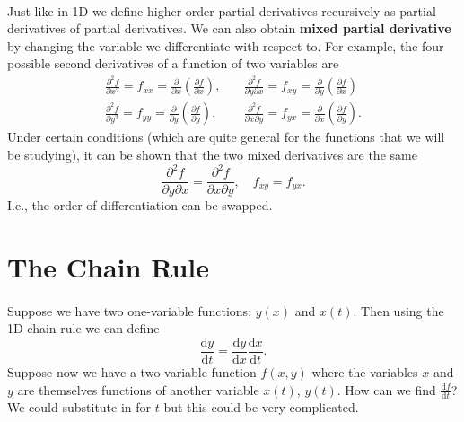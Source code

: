 \documentclass[../multivariate_calculus.tex]{subfiles}
\begin{document}
        \paragraph{}
        Just like in 1D we define higher order partial derivatives recursively as partial derivatives of partial derivatives.
        We can also obtain \textbf{mixed partial derivative} by changing the variable we differentiate with respect to.
        For example, the four possible second derivatives of a function of two variables are
        \begin{align}
            \frac{\partial^2 f}{\partial x^2}=f_{xx}=\frac{\partial}{\partial x}\left(\frac{\partial f}{\partial x}\right),&\quad\frac{\partial^2 f}{\partial y\partial x}=f_{xy}=\frac{\partial}{\partial y}\left(\frac{\partial f}{\partial x}\right)\\
            \frac{\partial^2 f}{\partial y^2}=f_{yy}=\frac{\partial}{\partial y}\left(\frac{\partial f}{\partial y}\right),&\quad\frac{\partial^2 f}{\partial x\partial y}=f_{yx}=\frac{\partial}{\partial x}\left(\frac{\partial f}{\partial y}\right).
        \end{align}
        Under certain conditions (which are quite general for the functions that we will be studying), it can be shown that the two mixed derivatives are the same
        \begin{equation}
            \frac{\partial^2 f}{\partial y\partial x}=\frac{\partial^2 f}{\partial x\partial y},\quad f_{xy}=f_{yx}.
        \end{equation}
        I.e., the order of differentiation can be swapped.

    \section{The Chain Rule}
        \paragraph{}
        Suppose we have two one-variable functions; $y(x)$ and $x(t)$.
        Then using the 1D chain rule we can define
        \begin{equation}
            \frac{\mathrm{d}y}{\mathrm{d}t}=\frac{\mathrm{d}y}{\mathrm{d}x}\frac{\mathrm{d}x}{\mathrm{d}t}.
        \end{equation}
        Suppose now we have a two-variable function $f(x,y)$ where the variables $x$ and $y$ are themselves functions of another variable $x(t)$, $y(t)$.
        How can we find $\frac{\mathrm{d}f}{\mathrm{d}t}$?
        We could substitute in for $t$ but this could be very complicated.
\end{document}
